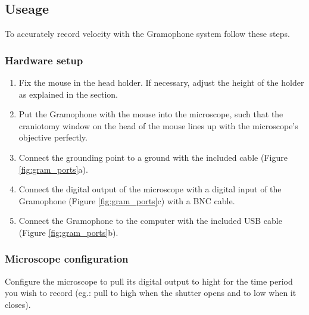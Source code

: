\documentclass[11pt,a4paper]{article}
\begin{document}
\subsection{Useage}
To accurately record velocity with the Gramophone system follow these steps.

\subsubsection{Hardware setup}
\begin{enumerate}
\item Fix the mouse in the head holder. If necessary, adjust the height of the holder as explained in the   section.
\item Put the Gramophone with the mouse into the microscope, such that the craniotomy window on the head of the mouse lines up with the microscope's objective perfectly.
\item Connect the grounding point to a ground with the included cable (Figure \ref{fig:gram_ports}a).
\item Connect the digital output of the microscope with a digital input of the Gramophone (Figure \ref{fig:gram_ports}c) with a BNC cable.
\item Connect the Gramophone to the computer with the included USB cable (Figure \ref{fig:gram_ports}b).
\end{enumerate}

\subsubsection{Microscope configuration}
Configure the microscope to pull its digital output to hight for the time period you wish to record (eg.: pull to high when the shutter opens and to low when it closes).
\end{document}

